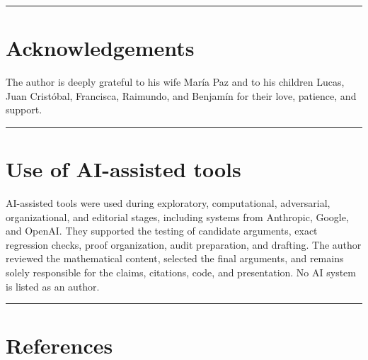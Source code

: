 \documentclass[
  11pt,
]{article}
\begin{document}
\begin{center}\rule{0.5\linewidth}{0.5pt}\end{center}

\section{Acknowledgements}\label{acknowledgements}

The author is deeply grateful to his wife María Paz and to his children
Lucas, Juan Cristóbal, Francisca, Raimundo, and Benjamín for their love,
patience, and support.

\begin{center}\rule{0.5\linewidth}{0.5pt}\end{center}

\section{Use of AI-assisted tools}\label{use-of-ai-assisted-tools}

AI-assisted tools were used during exploratory, computational,
adversarial, organizational, and editorial stages, including systems
from Anthropic, Google, and OpenAI. They supported the testing of
candidate arguments, exact regression checks, proof organization, audit
preparation, and drafting. The author reviewed the mathematical content,
selected the final arguments, and remains solely responsible for the
claims, citations, code, and presentation. No AI system is listed as an
author.

\begin{center}\rule{0.5\linewidth}{0.5pt}\end{center}

\section{References}\label{references}
\end{document}
